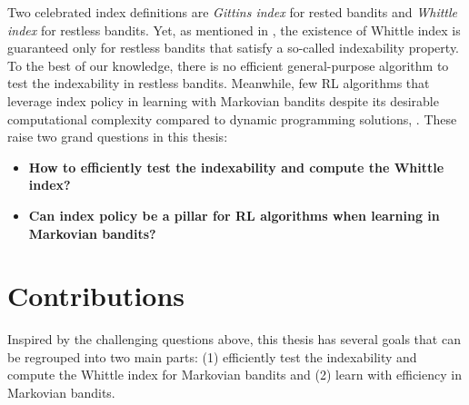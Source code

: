 Two celebrated index definitions are \emph{Gittins index} \cite{gittins1979bandit} for rested bandits and \emph{Whittle index} \cite{whittle1988restless} for restless bandits.
Yet, as mentioned in \cite[Chapter~14]{whittle1996optimal}, the existence of Whittle index is guaranteed only for restless bandits that satisfy a so-called indexability property.
To the best of our knowledge, there is no efficient general-purpose algorithm to test the indexability in restless bandits.
Meanwhile, few RL algorithms that leverage index policy in learning with Markovian bandits despite its desirable computational complexity compared to dynamic programming solutions, .
These raise two grand questions in this thesis:
\begin{itemize}
    \item {\color{myblue}\bfseries\large How to efficiently test the indexability and compute the Whittle index?}
    \item {\color{myblue}\bfseries\large Can index policy be a pillar for RL algorithms when learning in Markovian bandits?}
\end{itemize}

\section{Contributions}

Inspired by the challenging questions above, this thesis has several goals that can be regrouped into two main parts: (1) efficiently test the indexability and compute the Whittle index for Markovian bandits and (2) learn with efficiency in Markovian bandits.


